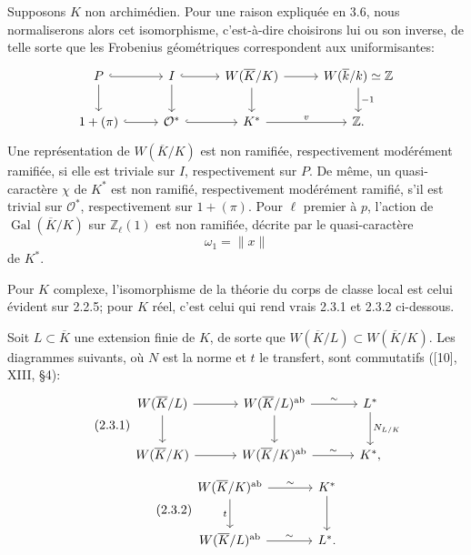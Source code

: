 \documentclass[10pt]{article}
\newcommand{\Z}{\mathbb Z}
\newcommand{\Gal}{\operatorname{Gal}}
\providecommand{\ab}{\mathrm{ab}}
\providecommand{\ab}{\mathrm{ab}}
\begin{document}
Supposons \(K\) non archimédien. Pour une raison expliquée en 3.6, nous normaliserons alors cet isomorphisme, c'est-à-dire choisirons lui ou son inverse, de telle sorte que les Frobenius géométriques correspondent aux uniformisantes:
\[
\begin{tikzcd}[column sep=2.7em,row sep=1.9em]
P \arrow[r,hook] \arrow[d] & I \arrow[r,hook] \arrow[d] &
W(\overline K/K) \arrow[r] \arrow[d] &
W(\overline k/k)\simeq\Z \arrow[d,"{-1}"]\\
1+(\pi) \arrow[r,hook] & \mathcal O^* \arrow[r,hook] &
K^* \arrow[r,"v"] & \Z .
\end{tikzcd}
\]
Une représentation de \(W(\overline K/K)\) est non ramifiée, respectivement modérément ramifiée, si elle est triviale sur \(I\), respectivement sur \(P\). De même, un quasi-caractère \(\chi\) de \(K^*\) est non ramifié, respectivement modérément ramifié, s'il est trivial sur \(\mathcal O^*\), respectivement sur \(1+(\pi)\). Pour \(\ell\) premier à \(p\), l'action de \(\Gal(\overline K/K)\) sur \(\Z_\ell(1)\) est non ramifiée, décrite par le quasi-caractère
\[
\omega_1=\|x\|
\]
de \(K^*\).

Pour \(K\) complexe, l'isomorphisme de la théorie du corps de classe local est celui évident sur 2.2.5; pour \(K\) réel, c'est celui qui rend vrais 2.3.1 et 2.3.2 ci-dessous.

Soit \(L\subset\overline K\) une extension finie de \(K\), de sorte que \(W(\overline K/L)\subset W(\overline K/K)\). Les diagrammes suivants, où \(N\) est la norme et \(t\) le transfert, sont commutatifs ([10], XIII, §4):
\[
\tag{2.3.1}
\begin{tikzcd}[column sep=3.3em,row sep=2.2em]
W(\overline K/L) \arrow[r] \arrow[d] &
W(\overline K/L)^{\ab} \arrow[r,"\sim"] \arrow[d] &
L^* \arrow[d,"N_{L/K}"]\\
W(\overline K/K) \arrow[r] &
W(\overline K/K)^{\ab} \arrow[r,"\sim"] &
K^* ,
\end{tikzcd}
\]
\[
\tag{2.3.2}
\begin{tikzcd}[column sep=3.5em,row sep=2.3em]
W(\overline K/K)^{\ab} \arrow[r,"\sim"] \arrow[d,"t"'] &
K^* \arrow[d]\\
W(\overline K/L)^{\ab} \arrow[r,"\sim"] &
L^* .
\end{tikzcd}
\]
\end{document}
